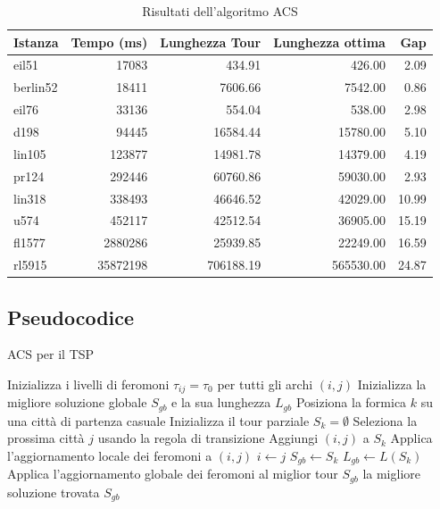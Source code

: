 \begin{table}
	\centering
	\caption{Risultati dell'algoritmo ACS}
	\begin{tabular}{lrrrr}
		\toprule
		Istanza  & Tempo (ms) & Lunghezza Tour & Lunghezza ottima & Gap   \\
		\midrule
		eil51    & 17083      & 434.91         & 426.00           & 2.09  \\
		berlin52 & 18411      & 7606.66        & 7542.00          & 0.86  \\
		eil76    & 33136      & 554.04         & 538.00           & 2.98  \\
		d198     & 94445      & 16584.44       & 15780.00         & 5.10  \\
		lin105   & 123877     & 14981.78       & 14379.00         & 4.19  \\
		pr124    & 292446     & 60760.86       & 59030.00         & 2.93  \\
		lin318   & 338493     & 46646.52       & 42029.00         & 10.99 \\
		u574     & 452117     & 42512.54       & 36905.00         & 15.19 \\
		fl1577   & 2880286    & 25939.85       & 22249.00         & 16.59 \\
		rl5915   & 35872198   & 706188.19      & 565530.00        & 24.87 \\
		\bottomrule
	\end{tabular}
\end{table}
\subsection{Pseudocodice}

\begin{algorithm}[H]
	\caption{\gls{ACS} per il \gls{TSP}}
	\begin{algorithmic}[1]
		\State Inizializza i livelli di feromoni $\tau_{ij} = \tau_0$ per tutti gli archi $(i,j)$
		\State Inizializza la migliore soluzione globale $S_{gb}$ e la sua lunghezza $L_{gb}$
		\State Posiziona la formica $k$ su una città di partenza casuale
		\State Inizializza il tour parziale $S_k = \emptyset$
		\Repeat
		\State Seleziona la prossima città $j$ usando la regola di transizione
		\State Aggiungi $(i,j)$ a $S_k$
		\State Applica l'aggiornamento locale dei feromoni a $(i,j)$
		\State $i \gets j$
		\State $S_{gb} \gets S_k$
		\State $L_{gb} \gets L(S_k)$
		\EndIf
		\EndFor
		\State Applica l'aggiornamento globale dei feromoni al miglior tour $S_{gb}$
		\EndFor
		\State \Return la migliore soluzione trovata $S_{gb}$
	\end{algorithmic}
	\label{alg:acs}
\end{algorithm}



